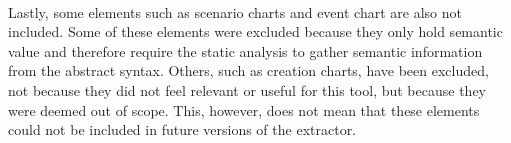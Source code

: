 \paragraph{}
Lastly, some elements such as scenario charts and event chart are also not included. Some of these elements were excluded because they only hold semantic value and therefore require the static analysis to gather semantic information from the abstract syntax. Others, such as creation charts, have been excluded, not because they did not feel relevant or useful for this tool, but because they were deemed out of scope. This, however, does not mean that these elements could not be included in future versions of the extractor.
